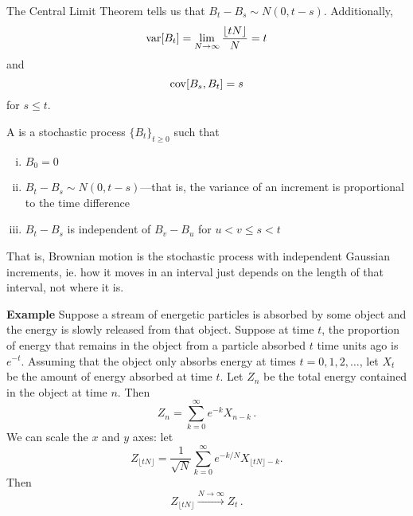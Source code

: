 \documentclass[../../../Master/AppliedStochastics.tex]{subfiles}
\begin{document}
The Central Limit Theorem tells us that $B_t - B_s \sim N(0, t - s)$.  
Additionally,
\begin{equation*}
    \operatorname{var}[B_t] = \lim_{N \to \infty} \dfrac{\lfloor t N\rfloor}{N} = t
\end{equation*} 
and
\begin{equation*}
    \operatorname{cov}[B_s, B_t] = s
\end{equation*}
    for $s \leq t$.


\begin{definition}
A  is a stochastic process $\{B_t\}_{t \geq 0}$
    such that
\begin{enumerate}[(i)]
    \item $B_0 = 0$
    \item $B_t - B_s \sim N(0, t - s)$---that is,
        the variance of an increment is proportional to the time difference
    \item $B_t - B_s$ is independent of $B_v - B_u$ for $u < v \leq s < t$ 
\end{enumerate}
\end{definition}


That is, Brownian motion is
    the stochastic process with independent Gaussian increments,
    ie. how it moves in an interval just depends
        on the length of that interval, not where it is.


\textbf{Example}
Suppose a stream of energetic particles is absorbed by some object
    and the energy is slowly released from that object.
Suppose at time $t$,
    the proportion of energy that remains in the object
    from a particle absorbed $t$ time units ago is $e^{-t}$.
Assuming that the object only absorbs energy at times $t = 0, 1, 2, \ldots$,
    let $X_t$ be the amount of energy absorbed at time $t$.
Let $Z_n$ be the total energy contained in the object at time $n$.
Then
\begin{equation*}
    Z_n = \sum_{k = 0}^\infty e^{-k}X_{n - k}\,.
\end{equation*}
We can scale the $x$ and $y$ axes: let
\begin{equation*}
    Z_{\lfloor t N\rfloor} = \frac{1}{\sqrt{N}} \sum_{k=0}^\infty
         e^{-k/N}X_{\lfloor t N\rfloor - k}.
\end{equation*}
Then
\begin{equation*}
    Z_{\lfloor t N\rfloor}\xrightarrow{N \to \infty} Z_t\,.
\end{equation*}


%
\end{document}
